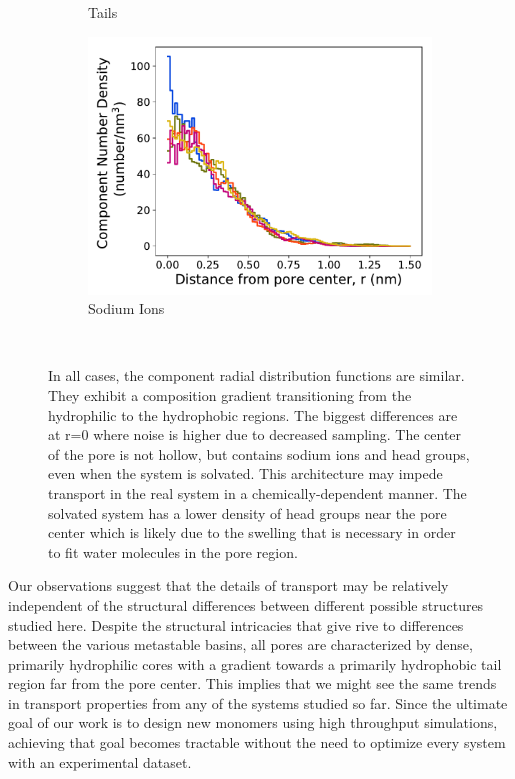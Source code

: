 \documentclass[journal=jpcbfk,manuscript=article]{achemso}
\begin{document}
\begin{figure}[!htb]
\begin{subfigure}{0.32\textwidth}
        \caption{Tails}
        \label{fig:tails_regional_density}
  \end{subfigure}
  \begin{subfigure}{0.32\textwidth}
        \includegraphics[width=1\linewidth]{sodium_density.pdf}
        \caption{Sodium Ions}
        \label{fig:sodium_regional_density}
  \end{subfigure}
  \caption{In all cases, the component radial distribution functions are similar. 
      They exhibit a composition gradient transitioning from the hydrophilic to the hydrophobic
	  regions. The biggest differences are at r=0 where noise is higher due to 
	  decreased sampling. The center of the pore is not hollow, but contains sodium ions and 
	  head groups, even when the system is solvated. This architecture may impede transport in 
	  the real system in a chemically-dependent manner. 
          The solvated system has a lower density of head groups near the 
	  pore center which is likely due to the swelling that is necessary in order to fit water
	  molecules in the pore region.}~\label{fig:overlaid_densities}
  \end{figure}

  \label{addition:pore_composition}
  Our observations suggest that the details of transport may be relatively
  independent of the structural differences between different possible structures
  studied here. Despite the structural intricacies that give rive to differences
  between the various metastable basins, all pores are characterized by dense,
  primarily hydrophilic cores with a gradient towards a primarily hydrophobic
  tail region far from the pore center. This implies that we might see the same
  trends in transport properties from any of the systems studied so far. Since
  the ultimate goal of our work is to design new monomers using high throughput
  simulations, achieving that goal becomes tractable without the need to optimize
  every system with an experimental dataset. 
\end{document}

